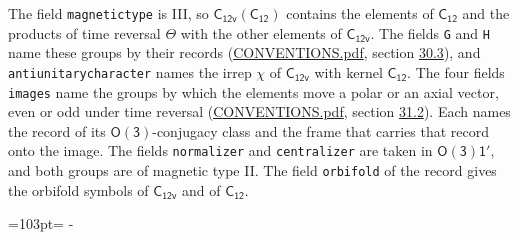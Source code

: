\documentclass[10pt,a4paper]{article}
\newcommand{\needspace}[1]{\par\penalty-100\begingroup\dimen0=#1\relax\dimen2=\pagegoal
  \advance\dimen2-\pagetotal\ifdim\dimen0>\dimen2\relax\ifdim\dimen2>0pt\vfil\break\fi\fi
  \endgroup}
\numberwithin{equation}{section}
\newcommand{\grp}[1]{\mathsf{#1}}
\begin{document}
The field \texttt{magnetictype} is III, so $\grp{C_{12v}}(\grp{C_{12}})$ contains the elements of $\grp{C_{12}}$ and the products of time reversal $\varTheta$ with the other elements of $\grp{C_{12v}}$. The fields \texttt{G} and \texttt{H} name these groups by their records (\href{../../CONVENTIONS.pdf}{CONVENTIONS.pdf}, section \href{../../CONVENTIONS.pdf\#conv.30.3}{30.3}), and \texttt{antiunitarycharacter} names the irrep $\chi$ of $\grp{C_{12v}}$ with kernel $\grp{C_{12}}$. The four fields \texttt{images} name the groups by which the elements move a polar or an axial vector, even or odd under time reversal (\href{../../CONVENTIONS.pdf}{CONVENTIONS.pdf}, section \href{../../CONVENTIONS.pdf\#conv.31.2}{31.2}). Each names the record of its $\grp{O(3)}$-conjugacy class and the frame that carries that record onto the image. The fields \texttt{normalizer} and \texttt{centralizer} are taken in $\grp{O(3)1'}$, and both groups are of magnetic type II. The field \texttt{orbifold} of the record gives the orbifold symbols of $\grp{C_{12v}}$ and of $\grp{C_{12}}$.
\needspace{103pt}
\end{document}
